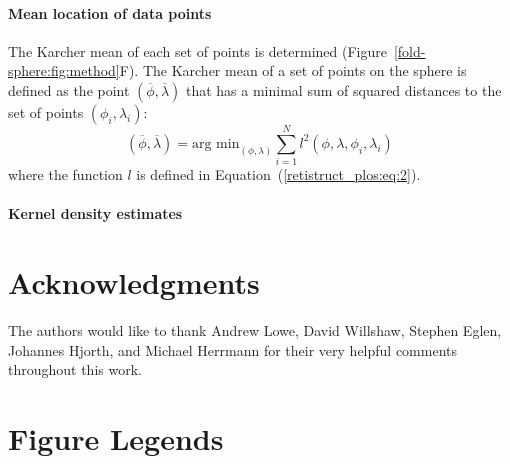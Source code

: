\documentclass[10pt]{article}
\begin{document}
\paragraph{Mean location of data points}
\label{retistruct_plos:sec:mean-location-data}

The Karcher mean of each set of points is determined
(Figure~\ref{fold-sphere:fig:method}F). The Karcher mean of a set of
points on the sphere \cite{Karc77riem,HeoSmal06form} is defined as the
point $(\overline{\phi}, \overline{\lambda})$ that has a minimal sum
of squared distances to the set of points $(\phi_i, \lambda_i)$:
\begin{equation}
  \label{retistruct_plos:eq:3}
  (\overline{\phi}, \overline{\lambda}) = \mbox{arg min}_{(\phi,
    \lambda)} \sum_{i=1}^N l^2(\phi, \lambda, \phi_i, \lambda_i)
\end{equation}
where the function $l$ is defined in
Equation~(\ref{retistruct_plos:eq:2}).

\paragraph{Kernel density estimates}
\label{retistruct_plos:sec:kern-dens-estim}




\section*{Acknowledgments}

The authors would like to thank Andrew Lowe, David Willshaw, Stephen
Eglen, Johannes Hjorth, and Michael Herrmann for their very helpful
comments throughout this work.

\newcommand{\myshortjournaltitles}{}

%

\section*{Figure Legends}
\end{document}
